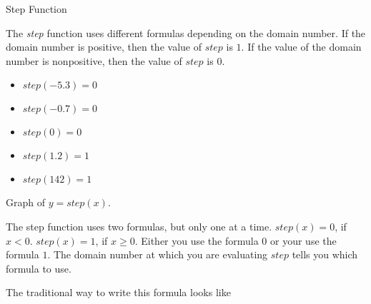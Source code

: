\documentclass{ximera}
\begin{document}
\begin{example} Step Function


The \textit{step} function uses different formulas depending on the domain number.  If the domain number is positive, then the value of $step$ is $1$. If the value of the domain number is nonpositive, then the value of $step$ is $0$.



\begin{itemize}
\item $step(-5.3) = 0$
\item $step(-0.7) = 0$
\item $step(0) = 0$
\item $step(1.2) = 1$
\item $step(142) = 1$
\end{itemize}



Graph of $y = step(x)$.
\begin{image}
\end{image}


\end{example}





The step function uses two formulas, but only one at a time.  $step(x) = 0$, if $x < 0$. $step(x) = 1$, if $x \geq 0$.  Either you use the formula $0$ or your use the formula $1$.  The domain number at which you are evaluating $step$ tells you which formula to use.


The traditional way to write this formula looks like
\end{document}
